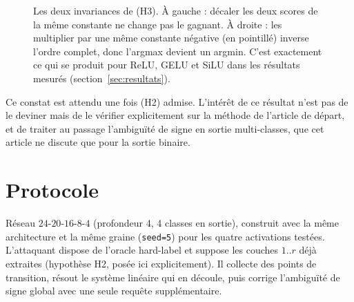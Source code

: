\documentclass[11pt]{article}
\begin{document}
\begin{figure}[h]
\centering
{}
\caption{Les deux invariances de (H3). À gauche : décaler les deux scores de
la même constante ne change pas le gagnant. À droite : les multiplier par une
même constante négative (en pointillé) inverse l'ordre complet, donc
l'argmax devient un argmin. C'est exactement ce qui se produit pour ReLU,
GELU et SiLU dans les résultats mesurés (section~\ref{sec:resultats}).}
\label{fig:invariances}
\end{figure}

Ce constat est attendu une fois (H2) admise. L'intérêt de ce résultat n'est
pas de le deviner mais de le vérifier explicitement sur la méthode de
l'article de départ, et de traiter au passage l'ambiguïté de signe en sortie
multi-classes, que cet article ne discute que pour la sortie binaire.

\section{Protocole}

Réseau $24$-$20$-$16$-$8$-$4$ (profondeur 4, 4 classes en sortie), construit
avec la même architecture et la même graine (\texttt{seed=5}) pour les
quatre activations testées. L'attaquant dispose de l'oracle hard-label et
suppose les couches $1..r$ déjà extraites (hypothèse H2, posée ici
explicitement). Il collecte des points de transition, résout le système
linéaire qui en découle, puis corrige l'ambiguïté de signe global avec une
seule requête supplémentaire.
\end{document}
